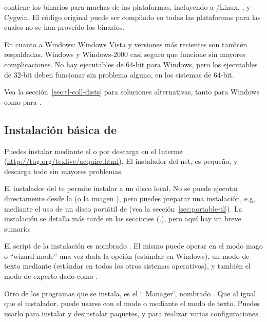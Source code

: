 \documentclass{article}
\begin{document}
\TL{} contiene los binarios para muchas de las plataformas, incluyendo
a \GNU/Linux, \MacOSX, y Cygwin. El código original puede ser
compilado en todas las plataformas para las cuales no se han proveído
los binarios.

En cuanto a Windows: Windows Vista  y versiones más recientes
son también respaldadas. Windows  y Windows-2000 casi
seguro que funcione sin mayores complicaciones. No hay
ejecutables de 64-bit para Windows, pero los ejecutables de
32-bit deben funcionar sin problema alguno, en los sistemas de
64-bit.

Vea la sección~\ref{sec:tl-coll-dists} para soluciones alternativas,
tanto para Windows como para \MacOSX.

\subsection{Instalación básica de \protect\TL{}}
\label{sec:basic}

Puedes instalar \TL{} mediante el \DVD{} o por descarga en el Internet
(\url{http://tug.org/texlive/acquire.html}). El instalador del net, es
pequeño, y descarga todo sin mayores problemas. 

El instalador del \DVD{} te permite instalar a un disco local. No se
puede ejecutar directamente \TL{} desde la \TK{} \DVD{} (o la
imagen ), pero puedes preparar una instalación, e.g,
mediante el uso de un disco portátil de \USB{} (vea la
sección~\ref{sec:portable-tl}). La instalación se detalla más tarde en
las secciones (\p.\pageref{sec:install}), pero aquí hay un breve
sumario:

\begin{itemize*}

\item El script de la instalación es nombrado . El
	mismo puede operar en el modo mago o ``wizard mode'' una vez dada
	la opción  (estándar en Windows), un modo de
	texto mediante  (estándar en todos los otros
	sistemas operativos), y también el modo de experto \GUI{} dado
	como .

\item Otro de los programas que se instala, es el `\TL\ Manager',
	nombrado . Que al igual que el instalador, puede
	usarse con el mode \GUI{} o mediante el modo de texto. Puedes
	usarlo para instalar y desinstalar paquetes, y para realizar
	varias configuraciones.

\end{itemize*}
\end{document}
